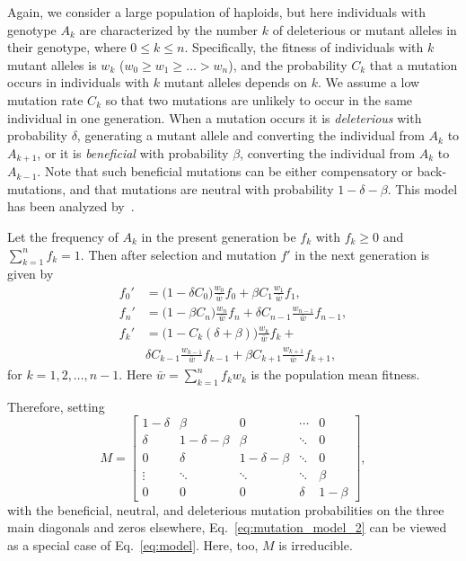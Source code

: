 \documentclass[9pt, a4paper, twocolumn]{extarticle}
\begin{document}
Again, we consider a large population of haploids, but here individuals with genotype $A_k$ are characterized by the number $k$ of deleterious or mutant alleles in their genotype, where $0 \le k \le n$.
Specifically, the fitness of individuals with $k$ mutant alleles is $w_k$ ($w_0 \ge w_1 \ge \ldots > w_n$),
and the probability $C_k$ that a mutation occurs in individuals with $k$ mutant alleles depends on $k$.
We assume a low mutation rate $C_k$ so that two mutations are unlikely to occur in the same individual in one generation.
When a mutation occurs it is \emph{deleterious} with probability $\delta$, generating a mutant allele and converting the individual from $A_k$ to $A_{k+1}$,
or it is \emph{beneficial} with probability $\beta$, converting the individual from $A_k$ to $A_{k-1}$.
Note that such beneficial mutations can be either compensatory or back-mutations, and that mutations are neutral with probability $1-\delta-\beta$.
This model has been analyzed by~\citet{Ram2012}.

Let the frequency of $A_k$ in the present generation be $f_k$ with $f_k \ge 0$ and $\sum_{k=1}^{n}{f_k}=1$.
Then after selection and mutation $f'$ in the next generation is given by
\begin{equation}
\begin{aligned}
f_0' &= \big(1 - \delta C_0\big) \frac{w_0}{\bar{w}} f_0 + \beta C_{1} \frac{w_{1}}{\bar{w}} f_{1}, \\
f_n' &= \big(1 - \beta C_n\big) \frac{w_n}{\bar{w}} f_n + \delta C_{n-1} \frac{w_{n-1}}{\bar{w}} f_{n-1}, \\
f_k' &= \big(1 - C_k(\delta+\beta)\big) \frac{w_k}{\bar{w}} f_k + \\
	 & \delta C_{k-1} \frac{w_{k-1}}{\bar{w}} f_{k-1} + 
	 \beta C_{k+1} \frac{w_{k+1}}{\bar{w}} f_{k+1},
\end{aligned}
\label{eq:mutation_model_2}
\end{equation}
for $k=1,2,\ldots, n-1$.
Here $\bar{w}=\sum_{k=1}^{n}{f_k w_k}$ is the population mean fitness.

Therefore, setting 
\begin{equation}
{M} = \begin{bmatrix}
1-\delta & \beta & 0 &  \cdots & 0\\
\delta & 1-\delta-\beta & \beta &  \ddots & 0\\
0 & \delta & 1-\delta-\beta & \ddots & 0 \\
\vdots & \ddots & \ddots & \ddots & \beta \\
0 & 0 & 0 & \delta & 1-\beta
\end{bmatrix},
\end{equation}
with the beneficial, neutral, and deleterious mutation probabilities on the three main diagonals and zeros elsewhere, 
Eq.~\ref{eq:mutation_model_2} can be viewed as a special case of Eq.~\ref{eq:model}.
Here, too, ${M}$ is irreducible.
\end{document}
